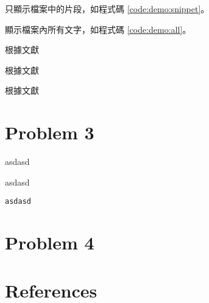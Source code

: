 \documentclass[12pt]{article}
\begin{document}
\begin{CJK}{UTF8}{bkai}
只顯示檔案中的片段，如程式碼 \ref{code:demo:snippet}。



顯示檔案內所有文字，如程式碼 \ref{code:demo:all}。



根據文獻 \cite{Chen2017b}

根據文獻 \cite{Features2018b}

根據文獻 \cite{Szeliski2010b}

\clearpage
\section{Problem 3}

asdasd

\textsf{asdasd}

\texttt{asdasd}

\clearpage
\section{Problem 4}

\clearpage
\section{References}

\begingroup  %
    \renewcommand{\section}[2]{}
    
    
\endgroup

\end{CJK}
\end{document}
